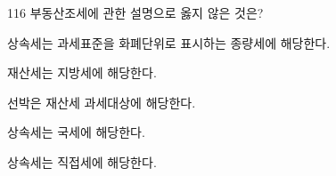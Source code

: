 \begin{question}{116}
부동산조세에 관한 설명으로 옳지 않은 것은?
\begin{choices}
  \item 상속세는 과세표준을 화폐단위로 표시하는 종량세에 해당한다.
  \item 재산세는 지방세에 해당한다.
  \item 선박은 재산세 과세대상에 해당한다.
  \item 상속세는 국세에 해당한다.
  \item 상속세는 직접세에 해당한다.
\end{choices}
\end{question}
